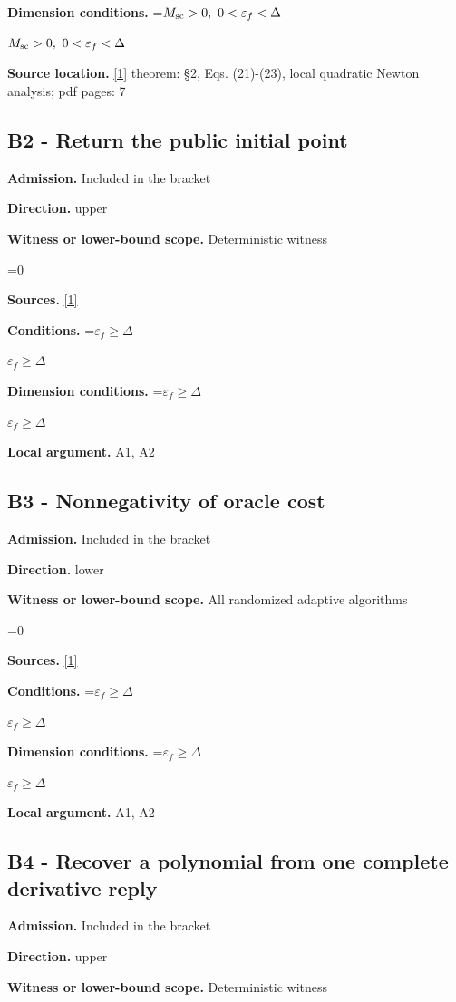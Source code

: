 \documentclass[10pt,a4paper]{article}
\newcommand{\AtlasMath}[1]{\par\begingroup\centering\setbox0=\hbox{$\displaystyle #1$}\ifdim\wd0>1.4\linewidth\typeout{ATLAS WIDE FORMULA: \the\wd0}\fi\ifdim\wd0>\linewidth\resizebox{\linewidth}{!}{\box0}\else\box0\fi\par\endgroup}
\newcommand{\AtlasInlineMath}[1]{\begingroup\setbox0=\hbox{$#1$}\ifdim\wd0>.4\linewidth\endgroup\AtlasMath{#1}\else\endgroup$#1$\fi}
\begin{document}
\textbf{Dimension conditions.} \AtlasInlineMath{M_{\rm sc}>0,\ 0<\varepsilon_f<\Delta}

\textbf{Source location.} \href{https://arxiv.org/pdf/2408.11022v1}{[1]} theorem: §2, Eqs. (21)-(23), local quadratic Newton analysis; pdf pages: 7

\subsection{B2 - Return the public initial point}
\textbf{Admission.} Included in the bracket

\textbf{Direction.} upper

\textbf{Witness or lower-bound scope.} Deterministic witness

\AtlasMath{0}
\textbf{Sources.} \href{https://arxiv.org/pdf/2408.11022v1}{[1]}

\textbf{Conditions.} \AtlasInlineMath{\varepsilon_f\ge\Delta}

\textbf{Dimension conditions.} \AtlasInlineMath{\varepsilon_f\ge\Delta}

\textbf{Local argument.} A1, A2

\subsection{B3 - Nonnegativity of oracle cost}
\textbf{Admission.} Included in the bracket

\textbf{Direction.} lower

\textbf{Witness or lower-bound scope.} All randomized adaptive algorithms

\AtlasMath{0}
\textbf{Sources.} \href{https://arxiv.org/pdf/2408.11022v1}{[1]}

\textbf{Conditions.} \AtlasInlineMath{\varepsilon_f\ge\Delta}

\textbf{Dimension conditions.} \AtlasInlineMath{\varepsilon_f\ge\Delta}

\textbf{Local argument.} A1, A2

\subsection{B4 - Recover a polynomial from one complete derivative reply}
\textbf{Admission.} Included in the bracket

\textbf{Direction.} upper

\textbf{Witness or lower-bound scope.} Deterministic witness
\end{document}
